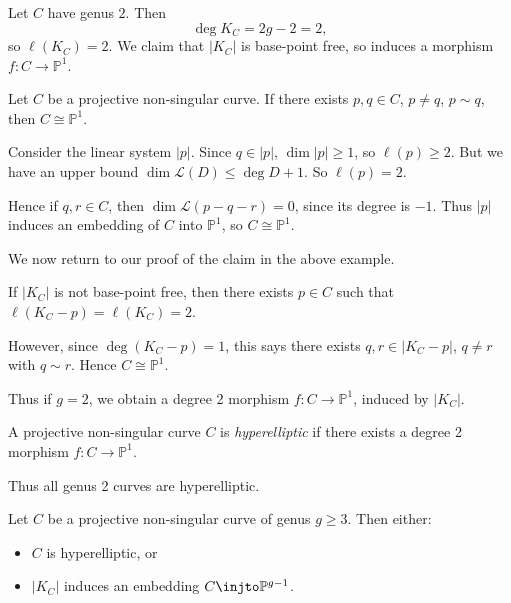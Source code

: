 \documentclass[12pt]{article}
\begin{document}
\begin{exbox}
	Let $C$ have genus $2$. Then
	\[
	\deg K_C = 2g - 2 = 2,
	\]
	so $\ell(K_C) = 2$. We claim that $|K_C|$ is base-point free, so induces a morphism $f : C \to \mathbb{P}^1$.
\end{exbox}

\begin{lemma}
	Let $C$ be a projective non-singular curve. If there exists $p, q \in C$, $p \neq q$, $p \sim q$, then $C \cong \mathbb{P}^1$.
\end{lemma}

\begin{proofbox}
	Consider the linear system $|p|$. Since $q \in |p|$, $\dim |p| \geq 1$, so $\ell(p) \geq 2$. But we have an upper bound $\dim \mathcal{L}(D) \leq \deg D + 1$. So $\ell(p) = 2$.

	Hence if $q, r \in C$, then $\dim \mathcal{L}(p - q - r) = 0$, since its degree is $-1$. Thus $|p|$ induces an embedding of $C$ into $\mathbb{P}^1$, so $C \cong \mathbb{P}^1$.
\end{proofbox}

We now return to our proof of the claim in the above example.

\begin{proofbox}
	If $|K_C|$ is not base-point free, then there exists $p \in C$ such that $\ell(K_C - p) = \ell(K_C) = 2$.

	However, since $\deg (K_C - p) = 1$, this says there exists $q, r \in |K_C - p|$,  $q \neq r$ with $q \sim r$. Hence $C \cong \mathbb{P}^1$.
\end{proofbox}

Thus if $g = 2$, we obtain a degree 2 morphism $f : C \to \mathbb{P}^1$, induced by $|K_C|$.

\begin{definition}
	A projective non-singular curve $C$ is \emph{hyperelliptic} if there exists a degree 2 morphism $f : C \to \mathbb{P}^1$.

	Thus all genus 2 curves are hyperelliptic.
\end{definition}

\begin{theorem}
	Let $C$ be a projective non-singular curve of genus $g \geq 3$. Then either:
	\begin{itemize}
		\item $C$ is hyperelliptic, or
		\item $|K_C|$ induces an embedding $C \injto \mathbb{P}^{g-1}$.
	\end{itemize}
\end{theorem}
\end{document}
